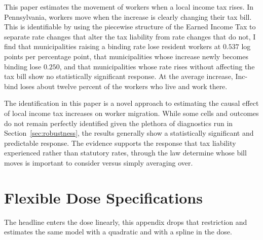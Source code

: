 \documentclass[12pt]{article}
\begin{document}
This paper estimates the movement of workers when a local income tax rises. In Pennsylvania, workers move when the increase is clearly changing their tax bill. This is identifiable by using the piecewise structure
of the Earned Income Tax to separate rate changes that alter the tax liability
from rate changes that do not, I find that municipalities raising a
binding rate lose resident workers at $0.537$ log points per percentage
point, that municipalities whose increase newly becomes binding lose
$0.250$, and that municipalities whose rate rises without affecting the tax
bill show no statistically significant response. At the average
increase, Inc-bind loses about twelve percent of
the workers who live and work there.

The identification in this paper is a novel approach to estimating the causal effect of local income tax increases on worker migration. While some cells and
outcomes do not remain perfectly identified given the plethora of diagnostics run in
Section~\ref{sec:robustness}, the results generally show a statistically significant and predictable response. The evidence
supports the response that tax liability experienced rather than statutory
rates, through the law determine whose bill moves is important to consider versus simply averaging over.

\newpage
\printbibliography


\appendix

\section{Flexible Dose Specifications}
\label{app:flex-dose}

The headline enters the dose linearly, this appendix drops that restriction and estimates the same
model with a quadratic and with a spline in the dose.
\end{document}
